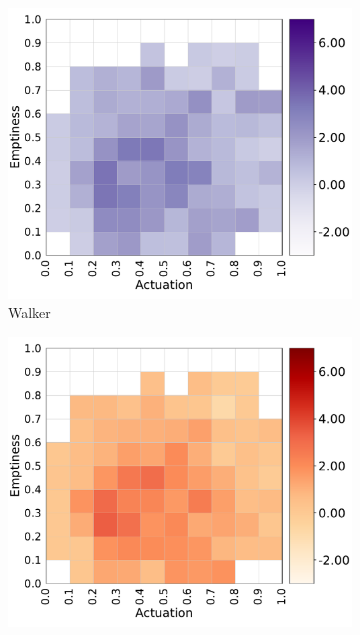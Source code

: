 \begin{figure}
    \centering
    \begin{subfigure}[b]{0.3\textwidth}
         \centering
         \includegraphics[scale=0.3]{images/multitasking/carrier_w.pdf}
         \caption{Walker}
         \label{carrier_a}
    \end{subfigure}
    \hfill
    \begin{subfigure}[b]{0.3\textwidth}
         \centering
         \includegraphics[scale=0.3]{images/multitasking/carrier_p.pdf}

\end{subfigure}
\end{figure}
